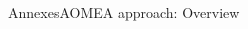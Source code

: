 \begin{frame}{Annexes}{AOMEA approach: Overview}
\begin{columns}
        \begin{column}{0.4\textwidth}
            \centering
        \end{column}

    \end{columns}


\end{frame}

